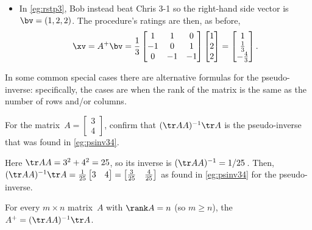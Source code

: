 \begin{example}
\begin{solution}
\begin{itemize}
\item In \autoref{eg:rstp3},  Bob instead beat Chris 3-1 so the right-hand side vector is \(\bv=(1,2,2)\).
The procedure's ratings are then, as before, 
\begin{equation*}
\xv=A^+\bv=\frac13\begin{bmatrix} 1&1&0
\\-1&0&1
\\0& -1&-1 \end{bmatrix}\begin{bmatrix} 1\\2\\2 \end{bmatrix}
=\begin{bmatrix} 1\\\frac13\\-\frac43 \end{bmatrix}.
\end{equation*}

\end{itemize}
\end{solution}
\end{example}



In some common special cases there are alternative formulas for the pseudo-inverse: specifically, the cases are when the rank of the matrix is the same as the number of rows and/or columns.

\begin{example}
For the matrix~\(A=\begin{bmatrix} 3\\4 \end{bmatrix}\),
confirm that \((\tr AA)^{-1}\tr A\) is the pseudo-inverse that was found in \autoref{eg:psinv34}.
\begin{solution}
Here \(\tr AA=3^2+4^2=25\), so its inverse is \((\tr AA)^{-1}=1/25\)\,.
Then, \((\tr AA)^{-1}\tr A=\frac1{25}\begin{bmatrix} 3&4 \end{bmatrix}=\begin{bmatrix} \tfrac3{25}&\tfrac4{25} \end{bmatrix}\) as found in \autoref{eg:psinv34} for the pseudo-inverse.
\end{solution}
\end{example}



\begin{theorem} \label{thm:pseudonormal}
For every \(m\times n\) matrix~\(A\) with \(\rank A=n\) (so \(m\geq n\)), the  \(A^+=(\tr AA)^{-1}\tr A\).
\end{theorem}

